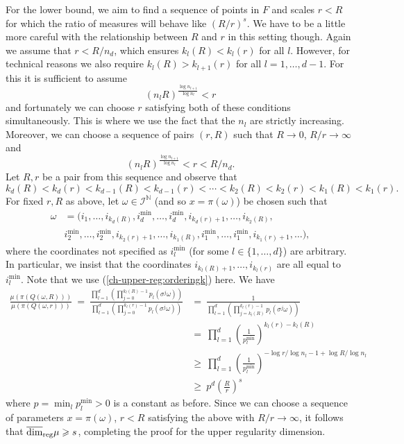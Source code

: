 For the lower bound, we aim to find a sequence of points in $F$ and scales $r<R$ for which the ratio of measures will behave like $(R/r)^s$. We have to be a little more careful with the relationship between $R$ and $r$ in this setting though. Again we assume that $r < R/ n_d$, which ensures $k_l(R) < k_l(r)$ for all $l$.  However, for technical reasons we also require $k_l(R) > k_{l+1}(r)$ for all $l = 1, \dots, d-1$.  For this it is sufficient to assume
\[
(n_lR)^{\frac{\log n_{l+1}}{\log n_l}} < r
\]
and fortunately we can choose $r$ satisfying both of these conditions simultaneously.  This is where we use the fact that the $n_l$ are strictly increasing.  Moreover, we can choose a sequence of pairs $(r,R)$ such that $R \to 0$, $R/r \to \infty$ and
\[
(n_lR)^{\frac{\log n_{l+1}}{\log n_l}} < r < R/ n_d.
\]
Let $R,r$ be a pair from this sequence and observe that
\begin{equation} \label{ch-upper-reg:orderingk}
k_d(R)< k_d(r)<k_{d-1}(R)< k_{d-1}(r)< \cdots <k_2(R)<k_2(r)<k_1(R)<k_1(r).
\end{equation}
For fixed $r,R$ as above, let $\omega \in \mathcal{I}^{\mathbb{N}}$ (and so $x = \pi(\omega)$) be chosen such that
\begin{align*} 
\omega&= (i_1,\ldots, i_{k_d(R)}, i_d^{\text{min}},\ldots, i_d^{\text{min}}, i_{k_d(r)+1},\ldots, i_{k_2(R)},\\
&i_2^{\text{min}},\ldots , i_2^{\text{min}}, i_{k_2(r)+1},\ldots, i_{k_1(R)}, i_1^{\text{min}}, \ldots, i_1^{\text{min}}, i_{k_1(r)+1},\ldots),
\end{align*}
where the coordinates not specified as $i_l^{\text{min}}$ (for some $l \in \{1, \dots, d\}$) are arbitrary.  In particular, we insist that the coordinates $i_{k_l(R)+1}, \dots, i_{k_l(r)}$ are all equal to $i_l^{\min}$. Note that we use (\ref{ch-upper-reg:orderingk}) here. We have
\begin{align*}
\frac{\mu(\pi(Q(\omega,R)))}{\mu(\pi(Q(\omega,r)))}  \ = \ \frac{\prod_{l=1}^d\left(\prod_{j=0}^{k_l(R)-1}p_l(\sigma^j \omega) \right)}{\prod_{l=1}^d\left(\prod_{j=0}^{k_l(r)-1}p_l(\sigma^j \omega) \right)} & =\ \frac{1}{\prod_{l=1}^d\left(\prod_{j=k_l(R)}^{k_l(r)-1}p_l(\sigma^j \omega) \right)} \\
& = \ \prod_{l=1}^d\left( \frac{1}{p_l^{\text{min}}}\right)^{k_l(r)-k_l(R)}  \\
& \ge\  \prod_{l=1}^d \left( \frac{1}{p_l^{\text{min}}}\right)^{-\log r/\log n_l -1+ \log R/\log n_l }  \\
& \ge \ p^{d} \left( \frac{R}{r} \right)^{s}
\end{align*}
where $p = \min_l p_l^{\text{min}}>0$ is a constant as before.  Since we can choose a sequence of parameters $x = \pi(\omega)$, $r<R$ satisfying the above with $R/r \to \infty$, it follows that $\overline{\dim}_{\textup{reg}} \mu \geqslant s$, completing the proof for the upper regularity dimension.






